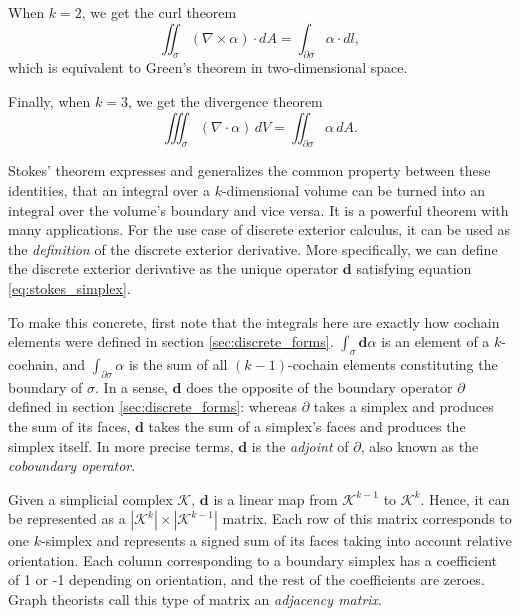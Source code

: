 \documentclass[utf8,english]{gradu3}
\begin{document}
When $k = 2$, we get the curl theorem
\begin{equation}\label{eq:curl_theorem}
  \iint_{\sigma} (\nabla \times \alpha) \cdot dA = \int_{\partial\sigma} \alpha \cdot dl,
\end{equation}
which is equivalent to Green's theorem in two-dimensional space.

Finally, when $k = 3$, we get the divergence theorem
\begin{equation}\label{eq:divergence_theorem}
  \iiint_{\sigma} (\nabla \cdot \alpha) \,dV = \iint_{\partial\sigma} \alpha \,dA.
\end{equation}

Stokes' theorem expresses and generalizes the common property between these identities,
that an integral over a $k$-dimensional volume
can be turned into an integral over the volume's boundary and vice versa.
It is a powerful theorem with many applications.
For the use case of discrete exterior calculus,
it can be used as the \textit{definition} of
the discrete exterior derivative.
More specifically, we can define the discrete exterior derivative
as the unique operator $\mathbf{d}$ satisfying equation \ref{eq:stokes_simplex}.

To make this concrete, first note that the integrals here
are exactly how cochain elements were defined in section \ref{sec:discrete_forms}.
$\int_{\sigma} \mathbf{d}\alpha$ is an element of a $k$-cochain,
and $\int_{\partial\sigma} \alpha$ is the sum of all $(k-1)$-cochain elements
constituting the boundary of $\sigma$.
In a sense, $\mathbf{d}$ does the opposite of the boundary operator $\partial$
defined in section \ref{sec:discrete_forms}:
whereas $\partial$ takes a simplex and produces the sum of its faces,
$\mathbf{d}$ takes the sum of a simplex's faces and produces the simplex itself.
In more precise terms, $\mathbf{d}$ is the \textit{adjoint} of $\partial$,
also known as the \textit{coboundary operator}.

Given a simplicial complex $\mathcal{K}$,
$\mathbf{d}$ is a linear map from $\mathcal{K}^{k-1}$ to $\mathcal{K}^k$.
Hence, it can be represented as a $|\mathcal{K}^k| \times |\mathcal{K}^{k-1}|$ matrix.
Each row of this matrix corresponds to one $k$-simplex
and represents a signed sum of its faces taking into account relative orientation.
Each column corresponding to a boundary simplex has a coefficient
of 1 or -1 depending on orientation,
and the rest of the coefficients are zeroes.
Graph theorists call this type of matrix an \textit{adjacency matrix}.
\end{document}
